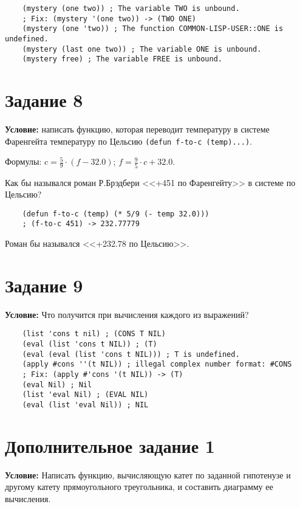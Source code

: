 \begin{lstlisting}
	(mystery (one two)) ; The variable TWO is unbound.
	; Fix: (mystery '(one two)) -> (TWO ONE)
	(mystery (one 'two)) ; The function COMMON-LISP-USER::ONE is undefined.
	(mystery (last one two)) ; The variable ONE is unbound.
	(mystery free) ; The variable FREE is unbound.
\end{lstlisting}


\section{Задание 8}

\textbf{Условие:} написать функцию, которая переводит температуру в системе Фаренгейта температуру по Цельсию \texttt{(defun f-to-c (temp)...)}. 

Формулы: $c = \frac{5}{9} \cdot (f - 32.0)$; $f= \frac{9}{5} \cdot c + 32.0$. 

Как бы назывался роман Р.Брэдбери <<+451 по Фаренгейту>> в системе по Цельсию?

\begin{lstlisting}
	(defun f-to-c (temp) (* 5/9 (- temp 32.0)))
	; (f-to-c 451) -> 232.77779
\end{lstlisting}

Роман бы назывался <<+232.78 по Цельсию>>.


\section{Задание 9}

\textbf{Условие:} Что получится при вычисления каждого из выражений?

\begin{lstlisting}
	(list 'cons t nil) ; (CONS T NIL)
	(eval (list 'cons t NIL)) ; (T)
	(eval (eval (list 'cons t NIL))) ; T is undefined.
	(apply #cons ''(t NIL)) ; illegal complex number format: #CONS
	; Fix: (apply #'cons '(t NIL)) -> (T)
	(eval Nil) ; Nil
	(list 'eval Nil) ; (EVAL NIL)
	(eval (list 'eval Nil)) ; NIL
\end{lstlisting}


\section{Дополнительное задание 1}

\textbf{Условие:} Написать функцию, вычисляющую катет по заданной гипотенузе и другому катету прямоугольного треугольника, и составить диаграмму ее вычисления.

